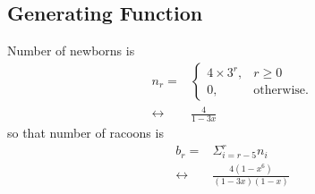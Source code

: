 \documentclass{sig-alternate-05-2015}
\begin{document}
\subsection{Generating Function}
Number of newborns is \begin{align}
	n_r = & \begin{cases}
		4 \times 3^r, & r \ge 0\\
		0, & \text{otherwise}.
	\end{cases}\\
	\leftrightarrow & \frac{4}{1 - 3x}
\end{align} so that number of racoons is \begin{align}
	b_r = & \Sigma_{i = r - 5}^{r} n_i\\
	\leftrightarrow & \frac{4(1 - x^6)}{(1 - 3x)(1 - x)}
\end{align}

\nocite{*}

 
\clearpage
\end{document}

